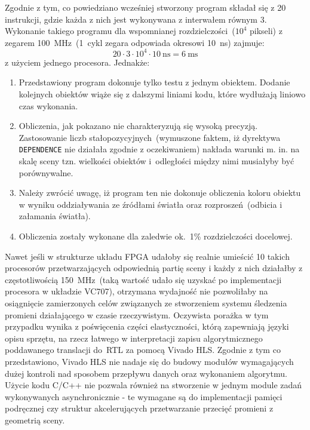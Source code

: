 Zgodnie z tym, co powiedziano wcześniej stworzony program składał się z 20 instrukcji, gdzie każda z nich jest wykonywana z interwałem równym 3. Wykonanie takiego programu dla wspomnianej rozdzielczości~($10^4$ pikseli) z zegarem 100~MHz~(1~cykl zegara odpowiada okresowi 10~ns) zajmuje:
\begin{equation}
20\cdot 3 \cdot 10^4 \cdot 10\ \mathrm{ns} = 6\ \mathrm{ms}
\end{equation}
z użyciem jednego procesora. Jednakże:
\begin{enumerate}
\item Przedstawiony program dokonuje tylko testu z jednym obiektem. Dodanie kolejnych obiektów wiąże się z dalszymi liniami kodu, które wydłużają liniowo czas wykonania.
\item Obliczenia, jak pokazano nie charakteryzują się wysoką precyzją. Zastosowanie liczb stałopozycyjnych~(wymuszone faktem, iż dyrektywa \texttt{DEPENDENCE} nie działała zgodnie z oczekiwaniem) nakłada warunki m. in. na skalę sceny tzn. wielkości obiektów i~odległości między nimi musiałyby być porównywalne.
\item Należy zwrócić uwagę, iż program ten nie dokonuje obliczenia koloru obiektu w wyniku oddziaływania ze źródłami światła oraz rozproszeń~(odbicia i załamania światła).
\item Obliczenia zostały wykonane dla zaledwie ok.~1\% rozdzielczości docelowej.
\end{enumerate}
Nawet jeśli w strukturze układu FPGA udałoby się realnie umieścić 10 takich procesorów przetwarzających odpowiednią partię sceny i każdy z nich działałby z częstotliwością 150~MHz~(taką wartość udało się uzyskać po implementacji procesora w układzie VC707), otrzymana wydajność nie pozwoliłaby na osiągnięcie zamierzonych celów związanych ze stworzeniem systemu śledzenia promieni działającego w czasie rzeczywistym. Oczywista porażka w tym przypadku wynika z poświęcenia części elastyczności, którą zapewniają języki opisu sprzętu, na rzecz łatwego w interpretacji zapisu algorytmicznego poddawanego translacji do~RTL za pomocą Vivado HLS. Zgodnie z tym co przedstawiono, Vivado HLS nie nadaje się do budowy modułów wymagających dużej kontroli nad sposobem przepływu danych oraz wykonaniem algorytmu. Użycie kodu C/C++ nie pozwala również na stworzenie w jednym module zadań wykonywanych asynchronicznie - te wymagane są do implementacji pamięci podręcznej czy struktur akcelerujących przetwarzanie przecięć promieni z geometrią sceny.

